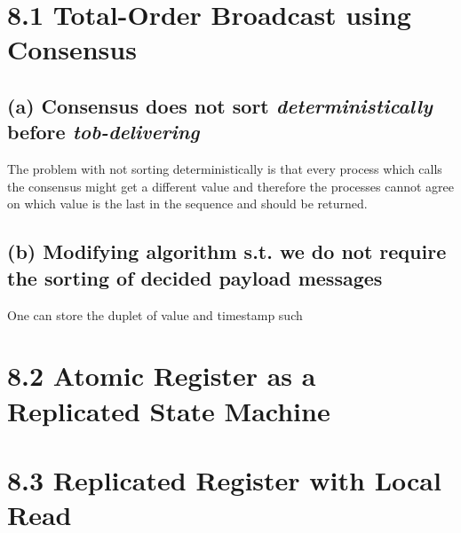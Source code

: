 \documentclass{article}
\begin{document}
	\pagestyle{fancy}
	\section*{8.1 Total-Order Broadcast using Consensus}
	\begin{adjustwidth}{2em}{2em}
		\subsection*{(a) Consensus does not sort \textit{deterministically} before \textit{tob-delivering}}
		\begin{adjustwidth}{2em}{2em}
			The problem with not sorting deterministically is that every process which calls the consensus might get a different value and therefore the processes cannot agree on which value is the last in the sequence and should be returned.
		\end{adjustwidth}
		\subsection*{(b) Modifying algorithm s.t. we do not require the sorting of decided payload messages}
		\begin{adjustwidth}{2em}{2em}
			One can store the duplet of value and timestamp such
		\end{adjustwidth}
	\end{adjustwidth}
	
	\section*{8.2 Atomic Register as a Replicated State Machine}
	\begin{adjustwidth}{2em}{2em}
	\end{adjustwidth}
	
	\section*{8.3 Replicated Register with Local Read}
	\begin{adjustwidth}{2em}{2em}
	\end{adjustwidth}
\end{document}
